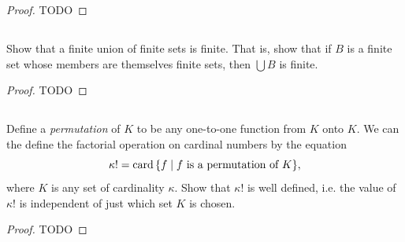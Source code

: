 \documentclass{report}
\begin{document}
  \begin{proof}
    TODO
  \end{proof}

\subsection{}%

  Show that a finite union of finite sets is finite.
  That is, show that if $B$ is a finite set whose members are themselves finite
    sets, then $\bigcup{B}$ is finite.

  \begin{proof}
    TODO
  \end{proof}

\subsection{}%

  Define a \textit{permutation} of $K$ to be any one-to-one function from $K$
    onto $K$.
  We can the define the factorial operation on cardinal numbers by the equation
    $$\kappa! = \mathop{\text{card}}{\{f \mid f \text{ is a permutation of } K\}},$$
    where $K$ is any set of cardinality $\kappa$.
  Show that $\kappa!$ is well defined, i.e. the value of $\kappa!$ is
    independent of just which set $K$ is chosen.

  \begin{proof}
    TODO
  \end{proof}
\end{document}
